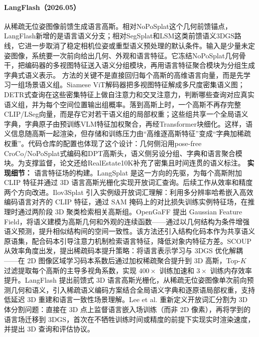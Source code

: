 \paragraph{LangFlash（2026.05）\cite{2605_23287}}
从稀疏无位姿图像前馈生成语言高斯。相对NoPoSplat这个几何前馈锚点，LangFlash新增的是语言语义分支；相对SegSplat和LSM这类前馈语义3DGS路线，它进一步取消了稳定相机位姿或重型语义预处理的默认条件。输入是少量未定姿图像，系统要一次前向给出几何、外观和语言特征。它冻结NoPoSplat几何骨干，把编码器的多视图特征送入语义分组模块，再用语言特征聚合模块为分组生成字典式语义表示。
方法的关键不是直接回归每个高斯的高维语言向量，而是先学习一组场景语义组。Siamese ViT解码器把多视图特征解成多尺度密集语义图；DETR式查询在这些密集特征上做自注意力和交叉注意力，判断哪些查询对应真实语义组，并为每个空间位置输出组概率。落到高斯上时，一个高斯不再存完整CLIP/LSeg向量，而是存它对若干语义组的局部权重；这些组共享一个全局语义字典，字典原子由预训练VLM特征加权聚合，再经Transformer块细化。这样，语义信息随高斯一起渲染，但存储和训练压力由“高维逐高斯特征”变成“字典加稀疏权重”。代码仓库的配置也体现了这个设计：几何侧沿用pose-free CroCo/NoPoSplat式编码和DPT高斯头，语义侧另设分组、字典和语言聚合模块。为支撑监督，论文还给RealEstate10K补充了密集且时间连贯的语义标注。
\textbf{实现细节：} 语言特征场的构建。LangSplat 是这一方向的先驱，为每个高斯附加 CLIP 特征并通过 3D 语言高斯光栅化实现开放词汇查询。后续工作从效率和精度两个方向改进。Ilov3Splat 引入实例级开放词汇理解：利用多分辨率哈希嵌入高效编码语言对齐的 CLIP 特征，通过 SAM 掩码上的对比损失训练实例特征场，在推理时通过两阶段 3D 聚类检索相关高斯组。OpenGaFF 提出 Gaussian Feature Field，将语义建模为高斯几何和外观的连续函数——通过以几何结构为条件增强语义预测，提升相似结构间的空间一致性。该方法还引入结构化码本作为共享语义原语集，配合码本引导注意力机制检索语言特征，降低对象内特征方差。SCOUP 从效率角度出发，提出稀疏码本提升策略：将语言表示学习与 3DGS 优化解耦——在 2D 图像区域学习码本系数后通过加权稀疏聚合提升到 3D 高斯，Top-$K$ 过滤提取每个高斯的主导多视角系数，实现 $400\times$ 训练加速和 $3\times$ 训练内存效率提升。LangFlash 提出前馈式 3D 语言高斯光栅化，从稀疏无位姿图像单次前向预测几何和语义，引入稀疏语义编码方案结合全局语义字典和逐原语局部权重，支持低延迟 3D 重建和语言一致性场景理解。Lee et al. 重新定义开放词汇分割为 3D 体分割问题：直接在 3D 点上监督语言嵌入场训练（而非 2D 像素），再将学到的语言场迁移到 3DGS，首次在不牺牲训练时间或精度的前提下实现实时渲染速度，并提出 3D 查询和评估协议。
